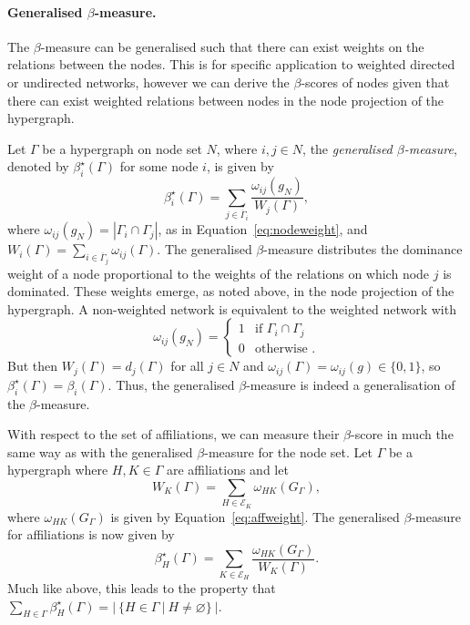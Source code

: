 \paragraph{Generalised $\beta$-measure.}

The $\beta$-measure can be generalised such that there can exist weights on the relations between the nodes. This is for specific application to weighted directed or undirected networks, however we can derive the $\beta$-scores of nodes given that there can exist weighted relations between nodes in the node projection of the hypergraph.

Let $\Gamma$ be a hypergraph on node set $N$, where $i,j \in N$, the \emph{generalised $\beta$-measure}, denoted by $\beta^{\star}_{i}(\Gamma)$ for some node $i$, is given by
\begin{equation}
\beta^{\star}_{i}(\Gamma) = \sum_{j \in \overline{\Gamma}_{i}} \frac{\omega_{ij}(g_{N})}{W_{j}(\Gamma)} ,
\end{equation}
where $\omega_{ij}(g_{N}) = | \Gamma_{i} \cap \Gamma_{j} |$, as in Equation~\ref{eq:nodeweight}, and $W_{i}(\Gamma) = \sum_{i \in \overline{\Gamma}_{j}} \omega_{ij}(\Gamma)$. The generalised $\beta$-measure distributes the dominance weight of a node proportional to the weights of the relations on which node $j$ is dominated. These weights emerge, as noted above, in the node projection of the hypergraph. A non-weighted network is equivalent to the weighted network with
\[
\omega_{ij}(g_{N} ) = \left\{
\begin{array}{ll}
1 & \mbox{if } \Gamma_{i} \cap \Gamma_{j}  \\
0 & \mbox{otherwise .}
\end{array} \right.
\]
But then $W_{j}(\Gamma) = d_{j}(\Gamma)$ for all $j \in N$ and $\omega_{ij}(\Gamma) = \omega_{ij}(g) \in \{0,1\}$, so $\beta^{\star}_{i}(\Gamma) = \beta_{i}(\Gamma)$. Thus, the generalised $\beta$-measure is indeed a generalisation of the $\beta$-measure.

With respect to the set of affiliations, we can measure their $\beta$-score in much the same way as with the generalised $\beta$-measure for the node set. Let $\Gamma$ be a hypergraph where $H, K \in \Gamma$ are affiliations and let
\begin{equation}
W_{K}(\Gamma) = \sum_{H \in \mathcal{E}_{K}} \omega_{HK}(G_{\Gamma}) ,
\end{equation}
where $\omega_{HK}(G_{\Gamma})$ is given by Equation~\ref{eq:affweight}. The generalised $\beta$-measure for affiliations is now given by
\begin{equation}
\beta^{\star}_{H}(\Gamma) = \sum_{K \in \mathcal{E}_{H}} \frac{\omega_{HK}(G_{\Gamma})}{W_{K}(\Gamma)} .
\end{equation}
Much like above, this leads to the property that $\sum_{H \in \Gamma} \beta^{\star}_{H} (\Gamma) = | ~ \{ H \in \Gamma ~ | ~ H \neq \varnothing \} ~ |$.

